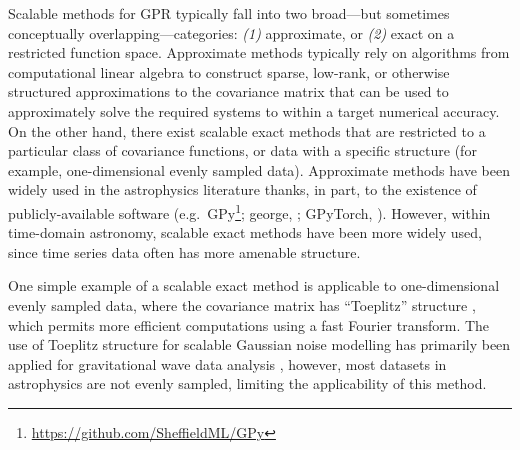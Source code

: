 \documentclass[letterpaper]{ar-1col}
\newcommand{\project}[1]{\textsf{#1}}
\begin{document}
Scalable methods for GPR typically fall into two broad---but sometimes conceptually overlapping---categories: \emph{(1)} approximate, or \emph{(2)} exact on a restricted function space.
Approximate methods typically rely on algorithms from computational linear algebra to construct sparse, low-rank, or otherwise structured approximations to the covariance matrix that can be used to approximately solve the required systems to within a target numerical accuracy.
On the other hand, there exist scalable exact methods that are restricted to a particular class of covariance functions, or data with a specific structure (for example, one-dimensional evenly sampled data).
Approximate methods \citep[e.g.,][]{inducing, george, kissgp, 2015arXiv151101870W} have been widely used in the astrophysics literature thanks, in part, to the existence of publicly-available software (e.g.\ \project{GPy}\footnote{\url{https://github.com/SheffieldML/GPy}}; \project{george}, \citealt{george}; \project{GPyTorch}, \citealt{gpytorch}).
However, within time-domain astronomy, scalable exact methods have been more widely used, since time series data often has more amenable structure.

One simple example of a scalable exact method is applicable to one-dimensional evenly sampled data, where the covariance matrix has ``Toeplitz'' structure \citep[e.g.,][]{toeplitz}, which permits more efficient computations using a fast Fourier transform.
The use of Toeplitz structure for scalable Gaussian noise modelling has primarily been applied for gravitational wave data analysis \citep[e.g.,][]{2020PhRvR...2d3298T, 2021arXiv210705609I}, however, most datasets in astrophysics are not evenly sampled, limiting the applicability of this method.
\end{document}
